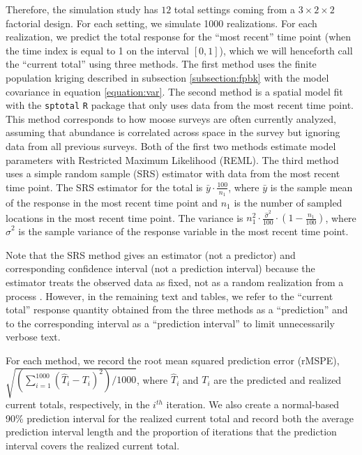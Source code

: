 \documentclass[]{interact}
\theoremstyle{plain}%
\theoremstyle{definition}
\theoremstyle{remark}
\begin{document}
Therefore, the simulation study has \(12\) total settings coming from a
\(3 \times 2 \times 2\) factorial design. For each setting, we simulate
1000 realizations. For each realization, we predict the total response
for the ``most recent'' time point (when the time index is equal to 1 on
the interval \([0, 1]\)), which we will henceforth call the ``current
total'' using three methods. The first method uses the finite population
kriging described in subsection \ref{subsection:fpbk} with the model
covariance in equation \ref{equation:var}. The second method is a
spatial model fit with the \texttt{sptotal} \texttt{R} package
\citep{higham2021sptotal} that only uses data from the most recent time
point. This method corresponds to how moose surveys are often currently
analyzed, assuming that abundance is correlated across space in the
survey but ignoring data from all previous surveys. Both of the first
two methods estimate model parameters with Restricted Maximum Likelihood
(REML). The third method uses a simple random sample (SRS) estimator
with data from the most recent time point. The SRS estimator for the
total is \(\bar{y} \cdot \frac{100}{n_1}\), where \(\bar{y}\) is the
sample mean of the response in the most recent time point and \(n_1\) is
the number of sampled locations in the most recent time point. The
variance is
\(n_1^2 \cdot \frac{\hat{\sigma}^2}{100} \cdot (1 - \frac{n_1}{100})\),
where \(\hat{\sigma}^2\) is the sample variance of the response variable
in the most recent time point.

Note that the SRS method gives an estimator (not a predictor) and
corresponding confidence interval (not a prediction interval) because
the estimator treats the observed data as fixed, not as a random
realization from a process
\citep{brus2021statistical, dumelle2022comparison}. However, in the
remaining text and tables, we refer to the ``current total'' response
quantity obtained from the three methods as a ``prediction'' and to the
corresponding interval as a ``prediction interval'' to limit
unnecessarily verbose text.

For each method, we record the root mean squared prediction error
(rMSPE), \(\sqrt{(\sum_{i = 1}^{1000}(\hat{T}_i - T_i)^2) / 1000}\),
where \(\hat{T}_i\) and \(T_i\) are the predicted and realized current
totals, respectively, in the \(i^{th}\) iteration. We also create a
normal-based 90\% prediction interval for the realized current total and
record both the average prediction interval length and the proportion of
iterations that the prediction interval covers the realized current
total.
\end{document}
